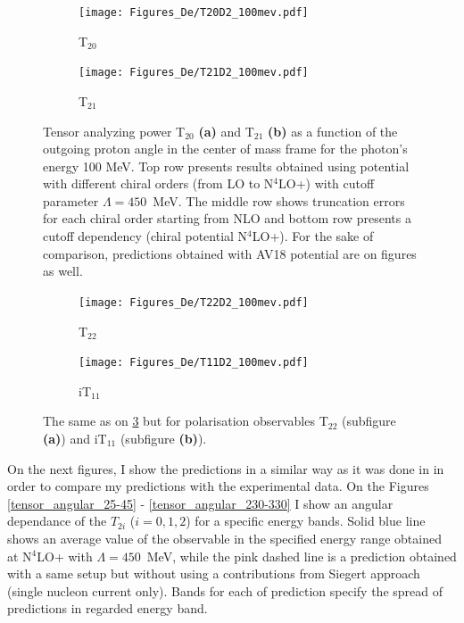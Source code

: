     \begin{figure}[htb]
        \centering
        \begin{subfigure}[b]{0.46\textwidth}
            \texttt{[image: Figures\_De/T20D2\_100mev.pdf]}
            \caption{T$_{20}$}
            \label{T20_100_vert}
        \end{subfigure}
        \begin{subfigure}[b]{0.46\textwidth}
            \texttt{[image: Figures\_De/T21D2\_100mev.pdf]}
            \caption{T$_{21}$}
            \label{T21_100_vert}
        \end{subfigure}
        \caption{Tensor analyzing power T$_{20}$  {\bf (a)}
        and T$_{21}$ {\bf (b)}
        as a function of the outgoing proton angle in the center of mass frame 
        for the photon's energy 100 MeV.
        Top row presents results obtained using potential
        with different chiral orders (from LO to N$^4$LO+) with cutoff parameter $\Lambda=450$~MeV.
        The middle row shows truncation errors for each 
        chiral order starting from NLO and
        bottom row presents a cutoff dependency (chiral potential N$^4$LO+).
        For the sake of comparison, predictions obtained with AV18 potential are on figures as well.}
        \label{T20_T21_100}
    \end{figure}

    \begin{figure}[htb]
        \centering
        \begin{subfigure}[b]{0.46\textwidth}
            \texttt{[image: Figures\_De/T22D2\_100mev.pdf]}
            \caption{T$_{22}$}
            \label{T22_100_vert}
        \end{subfigure}
        \begin{subfigure}[b]{0.46\textwidth}
            \texttt{[image: Figures\_De/T11D2\_100mev.pdf]}
            \caption{iT$_{11}$}
            \label{T11_100_vert}
        \end{subfigure}
        \caption{The same as on \ref{T20_T21_100} but for polarisation observables
        T$_{22}$ (subfigure {\bf (a)}) and iT$_{11}$ (subfigure {\bf (b)}).}
        \label{T22_T11_100}
    \end{figure}


    
    On the next figures, I show the predictions in a similar way as it was done
    in \cite{rachek2007} in order to compare my predictions with the experimental
    data. On the Figures \ref{tensor_angular_25-45} - \ref{tensor_angular_230-330}
    I show an angular dependance of the $T_{2i}$ ($i=0,1,2$) for a specific energy bands.
    Solid blue line shows an average value of the observable in the specified energy range
    obtained at N$^4$LO+ with $\Lambda=450$~MeV, while the pink dashed line is a prediction
    obtained with a same setup but without using a contributions from Siegert approach
    (single nucleon current only). Bands for each of prediction specify the spread of
    predictions in regarded energy band.
    
